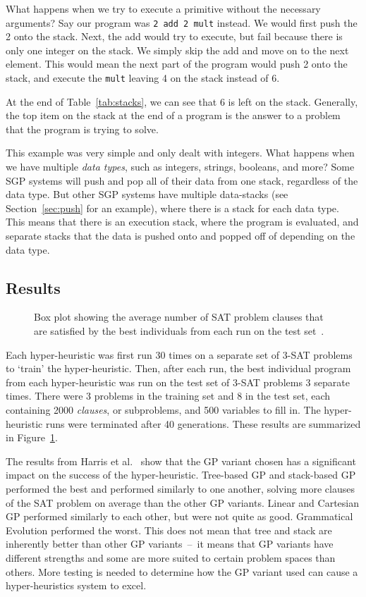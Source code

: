 \documentclass{sig-alternate}
\begin{document}
What happens when we try to execute a primitive without the necessary arguments? Say our program was \texttt{2~add~2~mult} instead. We would first push the 2 onto the stack. Next, the add would try to execute, but fail because there is only one integer on the stack. We simply skip the add and move on to the next element. This would mean the next part of the program would push 2 onto the stack, and execute the \texttt{mult} leaving 4 on the stack instead of 6.

At the end of Table~\ref{tab:stacks}, we can see that 6 is left on the stack. Generally, the top item on the stack at the end of a program is the answer to a problem that the program is trying to solve.

This example was very simple and only dealt with integers. What happens when we have multiple \textit{data types}, such as integers, strings, booleans, and more? Some SGP systems will push and pop all of their data from one stack, regardless of the data type. But other SGP systems have multiple data-stacks (see Section~\ref{sec:push} for an example), where there is a stack for each data type. This means that there is an execution stack, where the program is evaluated, and separate stacks that the data is pushed onto and popped off of depending on the data type.

\subsection{Results}
\label{sec:gpresults}
\begin{figure}
	\centering
	\caption{Box plot showing the average number of SAT problem clauses that are satisfied by the best individuals from each run on the test set~\cite{harris:2015}.}
	\label{fig:gpvariants}
\end{figure}
Each hyper-heuristic was first run 30 times on a separate set of 3-SAT problems to `train' the hyper-heuristic. Then, after each run, the best individual program from each hyper-heuristic was run on the test set of 3-SAT problems 3 separate times. There were 3 problems in the training set and 8 in the test set, each containing 2000 \textit{clauses}, or subproblems, and 500 variables to fill in. The hyper-heuristic runs were terminated after 40 generations. These results are summarized in Figure~\ref{fig:gpvariants}.

The results from Harris et al.~\cite{harris:2015} show that the GP variant chosen has a significant impact on the success of the hyper-heuristic. Tree-based GP and stack-based GP performed the best and performed similarly to one another, solving more clauses of the SAT problem on average than the other GP variants. Linear and Cartesian GP performed similarly to each other, but were not quite as good. Grammatical Evolution performed the worst. This does not mean that tree and stack are inherently better than other GP variants~--~it means that GP variants have different strengths and some are more suited to certain problem spaces than others. More testing is needed to determine how the GP variant used can cause a hyper-heuristics system to excel.
\end{document}
